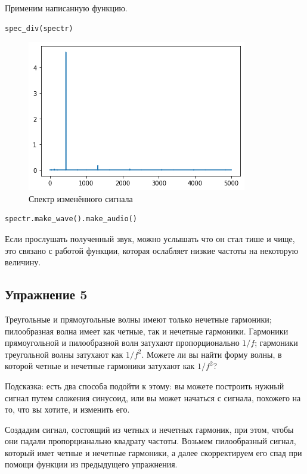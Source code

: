 Применим написанную функцию.

\begin{lstlisting}[language=Python]
spec_div(spectr)
\end{lstlisting}

\begin{figure}[H]
	\begin{center}
		\includegraphics[scale=1]{fig/lab02/lab02_9.png}
		\caption{Спектр изменённого сигнала}
	\end{center}
\end{figure}

\begin{lstlisting}[language=Python]
spectr.make_wave().make_audio()
\end{lstlisting}

Если прослушать полученный звук, можно услышать что он стал тише и чище, это связано с работой функции, которая ослабляет низкие частоты на некоторую величину.

\subsection{Упражнение 5}

Треугольные и прямоугольные волны имеют только нечетные гармоники; пилообразная волна имеет как четные, так и нечетные гармоники. Гармоники прямоугольной и пилообразной волн затухают пропорционально $1/f$; гармоники треугольной волны затухают как $1/f^2$. Можете ли вы найти форму волны, в которой четные и нечетные гармоники затухают как $1/f^2$?

\noindent Подсказка: есть два способа подойти к этому: вы можете построить нужный сигнал путем сложения синусоид, или вы может начаться с сигнала, похожего на то, что вы хотите, и изменить его.


\noindent Создадим сигнал, состоящий из четных и нечетных гармоник, при этом, чтобы они падали пропорцианально квадрату частоты. Возьмем пилообразный сигнал, который имет четные и нечетные гармоники, а далее скорректируем его спад при помощи функции из предыдущего упражнения.

